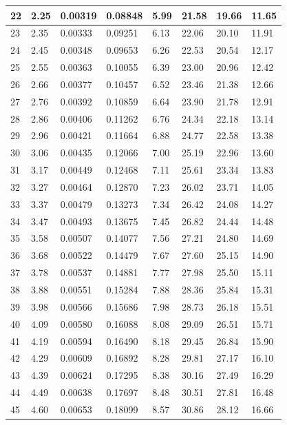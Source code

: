 \documentclass[12pt,a4paper,twoside]{article}
\begin{document}
\begin{center}
\begin{longtable}{l l l l | l l l l}
22 & 2.25 & 0.00319 & 0.08848 & 5.99 & 21.58 & 19.66 & 11.65 \\ \hline
23 & 2.35 & 0.00333 & 0.09251 & 6.13 & 22.06 & 20.10 & 11.91 \\ \hline
24 & 2.45 & 0.00348 & 0.09653 & 6.26 & 22.53 & 20.54 & 12.17 \\ \hline
25 & 2.55 & 0.00363 & 0.10055 & 6.39 & 23.00 & 20.96 & 12.42 \\ \hline
26 & 2.66 & 0.00377 & 0.10457 & 6.52 & 23.46 & 21.38 & 12.66 \\ \hline
27 & 2.76 & 0.00392 & 0.10859 & 6.64 & 23.90 & 21.78 & 12.91 \\ \hline
28 & 2.86 & 0.00406 & 0.11262 & 6.76 & 24.34 & 22.18 & 13.14 \\ \hline
29 & 2.96 & 0.00421 & 0.11664 & 6.88 & 24.77 & 22.58 & 13.38 \\ \hline
30 & 3.06 & 0.00435 & 0.12066 & 7.00 & 25.19 & 22.96 & 13.60 \\ \hline
31 & 3.17 & 0.00449 & 0.12468 & 7.11 & 25.61 & 23.34 & 13.83 \\ \hline
32 & 3.27 & 0.00464 & 0.12870 & 7.23 & 26.02 & 23.71 & 14.05 \\ \hline
33 & 3.37 & 0.00479 & 0.13273 & 7.34 & 26.42 & 24.08 & 14.27 \\ \hline
34 & 3.47 & 0.00493 & 0.13675 & 7.45 & 26.82 & 24.44 & 14.48 \\ \hline
35 & 3.58 & 0.00507 & 0.14077 & 7.56 & 27.21 & 24.80 & 14.69 \\ \hline
36 & 3.68 & 0.00522 & 0.14479 & 7.67 & 27.60 & 25.15 & 14.90 \\ \hline
37 & 3.78 & 0.00537 & 0.14881 & 7.77 & 27.98 & 25.50 & 15.11 \\ \hline
38 & 3.88 & 0.00551 & 0.15284 & 7.88 & 28.36 & 25.84 & 15.31 \\ \hline
39 & 3.98 & 0.00566 & 0.15686 & 7.98 & 28.73 & 26.18 & 15.51 \\ \hline
40 & 4.09 & 0.00580 & 0.16088 & 8.08 & 29.09 & 26.51 & 15.71 \\ \hline
41 & 4.19 & 0.00594 & 0.16490 & 8.18 & 29.45 & 26.84 & 15.90 \\ \hline
42 & 4.29 & 0.00609 & 0.16892 & 8.28 & 29.81 & 27.17 & 16.10 \\ \hline
43 & 4.39 & 0.00624 & 0.17295 & 8.38 & 30.16 & 27.49 & 16.29 \\ \hline
44 & 4.49 & 0.00638 & 0.17697 & 8.48 & 30.51 & 27.81 & 16.48 \\ \hline
45 & 4.60 & 0.00653 & 0.18099 & 8.57 & 30.86 & 28.12 & 16.66 \\ \hline

\end{longtable}
\end{center}
\end{document}
